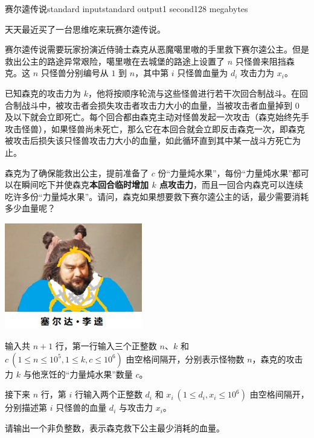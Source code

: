 \begin{problem}{赛尔逵传说}{standard input}{standard output}{1 second}{128 megabytes}

    天天最近买了一台思维吃来玩赛尔逵传说。

    赛尔逵传说需要玩家扮演近侍骑士森克从恶魔噶里嗷的手里救下赛尔逵公主。但是救出公主的路途异常艰险，噶里嗷在去城堡的路途上设置了 $n$ 只怪兽来阻挡森克。这 $n$ 只怪兽分别编号从 $1$ 到 $n$，其中第 $i$ 只怪兽血量为 $d_i$ 攻击力为 $x_i$。

    已知森克的攻击力为 $k$，他将按顺序轮流与这些怪兽进行若干次回合制战斗。在回合制战斗中，被攻击者会损失攻击者攻击力大小的血量，当被攻击者血量掉到 $0$ 及以下就会立即死亡。每个回合都由森克主动对怪兽发起一次攻击（森克始终先手攻击怪兽），如果怪兽尚未死亡，那么它在本回合就会立即反击森克一次，即森克被攻击后损失该只怪兽攻击力大小的血量，如此循环直到其中某一战斗方死亡为止。

    森克为了确保能救出公主，提前准备了 $c$ 份“力量炖水果”，每份“力量炖水果”都可以在瞬间吃下并使森克\textbf{本回合临时增加 $k$ 点攻击力}，而且一回合内森克可以连续吃许多份“力量炖水果”。请问，森克如果想要救下赛尔逵公主的话，最少需要消耗多少血量呢？

    \begin{center}
        \includegraphics[width=6cm]{Official/2.jpg}
    \end{center}


    \InputFile
    
    输入共 $n+1$ 行，第一行输入三个正整数 $n$、$k$ 和 $c\ (1\le n\le 10^5,1\le k,c\le 10^6)$ 由空格间隔开，分别表示怪物数 $n$，森克的攻击力 $k$ 与他烹饪的“力量炖水果”数量 $c$。

    接下来 $n$ 行，第 $i$ 行输入两个正整数 $d_i$ 和 $x_i\ (1\le d_i,x_i\le 10^6)$ 由空格间隔开，分别描述第 $i$ 只怪兽的血量 $d_i$ 与攻击力 $x_i$。
    
    \OutputFile
    
    请输出一个非负整数，表示森克救下公主最少消耗的血量。
    
    \Example
    

\end{problem}
